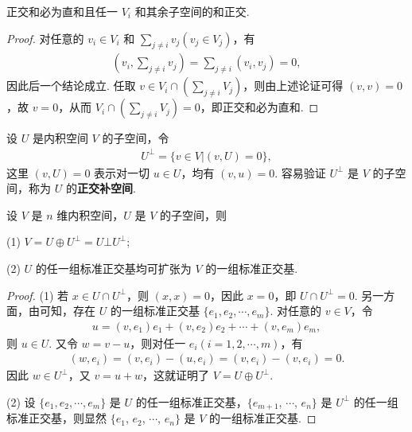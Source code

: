 \documentclass[../../main.tex]{subfiles}%
\begin{document}
\begin{lemma}\label{lemma:正交和必为直和}
正交和必为直和且任一 $V_i$ 和其余子空间的和正交.
\end{lemma}
\begin{proof}
对任意的 $v_i \in V_i$ 和 $\sum_{j \neq i}v_j (v_j \in V_j)$，有
\begin{align*}
(v_i, \sum_{j \neq i}v_j) = \sum_{j \neq i}(v_i, v_j) = 0,
\end{align*}
因此后一个结论成立. 任取 $v \in V_i \cap (\sum_{j \neq i}V_j)$，则由上述论证可得 $(v, v) = 0$，故 $v = 0$，从而 $V_i \cap (\sum_{j \neq i}V_j) = 0$，即正交和必为直和.
\end{proof}

\begin{definition}[正交补空间]\label{definition:正交补空间}
设 $U$ 是内积空间 $V$ 的子空间，令
\begin{align*}
U^\perp = \{v \in V | (v, U) = 0\},
\end{align*}
这里 $(v, U) = 0$ 表示对一切 $u \in U$，均有 $(v, u) = 0$. 容易验证 $U^\perp$ 是 $V$ 的子空间，称为 $U$ 的\textbf{正交补空间}.
\end{definition}

\begin{theorem}
设 $V$ 是 $n$ 维内积空间，$U$ 是 $V$ 的子空间，则

(1) $V = U \oplus U^\perp=U\bot U^{\bot}$;

(2) $U$ 的任一组标准正交基均可扩张为 $V$ 的一组标准正交基.
\end{theorem}
\begin{proof}
(1) 若 $x \in U \cap U^\perp$，则 $(x, x) = 0$，因此 $x = 0$，即 $U \cap U^\perp = 0$. 另一方面，由可知，存在 $U$ 的一组标准正交基 $\{e_1, e_2, \cdots, e_m\}$. 对任意的 $v \in V$，令
\begin{align*}
u = (v, e_1)e_1 + (v, e_2)e_2 + \cdots + (v, e_m)e_m,
\end{align*}
则 $u \in U$. 又令 $w = v - u$，则对任一 $e_i (i = 1, 2, \cdots, m)$，有
\begin{align*}
(w, e_i) = (v, e_i) - (u, e_i) = (v, e_i) - (v, e_i) = 0.
\end{align*}
因此 $w \in U^\perp$，又 $v = u + w$，这就证明了 $V = U \oplus U^\perp$.

(2) 设 $\{e_1, e_2, \cdots, e_m\}$ 是 $U$ 的任一组标准正交基，$\{e_{m + 1}$, $\cdots$, $e_n\}$ 是 $U^\perp$ 的任一组标准正交基，则显然 $\{e_1$, $e_2$, $\cdots$, $e_n\}$ 是 $V$ 的一组标准正交基. 
\end{proof}
\end{document}
